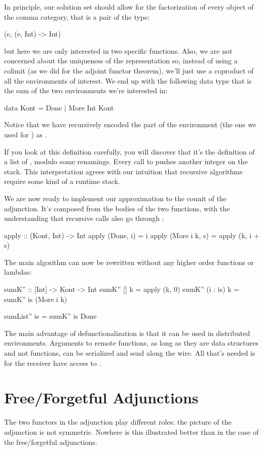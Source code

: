 \documentclass[DaoFP]{subfiles}
\begin{document}
In principle, our solution set should allow for the factorization of every object of the comma category, that is a pair of the type:
\begin{haskell}
(e, (e, Int) -> Int)
\end{haskell}
but here we are only interested in two specific functions. Also, we are not concerned about the uniqueness of the representation so, instead of using a colimit (as we did for the adjoint functor theorem), we'll just use a coproduct of all the environments of interest. We end up with the following data type that is the sum of the two environments we're interested in:
\begin{haskell}
data Kont = Done | More Int Kont
\end{haskell}
Notice that we have recursively encoded the  part of the environment (the one we used for ) as . 

If you look at this definition carefully, you will discover that it's the definition of a list of , modulo some renamings. Every call to  pushes another integer on the  stack. This interpretation agrees with our intuition that recursive algorithms require some kind of a runtime stack. 

We are now ready to implement our approximation to the counit of the adjunction. It's composed from the bodies of the two functions, with the understanding that recursive calls also go through :
\begin{haskell}
apply :: (Kont, Int) -> Int
apply (Done, i) = i
apply (More i k, s) = apply (k, i + s)
\end{haskell}
The main algorithm can now be rewritten without any higher order functions or lambdas:
\begin{haskell}
sumK'' :: [Int] -> Kont -> Int
sumK'' [] k = apply (k, 0)
sumK'' (i : is) k = sumK'' is (More i k)
\end{haskell}

\begin{haskell}
sumList'' is = sumK'' is Done
\end{haskell}

The main advantage of defunctionalization is that it can be used in distributed environments. Arguments to remote functions, as long as they are data structures and not functions, can be serialized and send along the wire. All that's needed is for the receiver have access to . 

\section{Free/Forgetful Adjunctions}
The two functors in the adjunction play different roles: the picture of the adjunction is not symmetric. Nowhere is this illustrated better than in the case of the free/forgetful adjunctions. 
\end{document}
